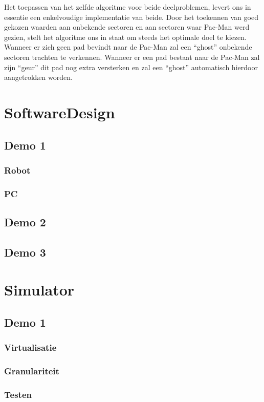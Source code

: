 \documentclass[12pt,a4paper]{report}
\begin{document}
Het toepassen van het zelfde algoritme voor beide deelproblemen, levert ons in essentie een enkelvoudige implementatie van beide. Door het toekennen van goed gekozen waarden aan onbekende sectoren en aan sectoren waar Pac-Man werd gezien, stelt het algoritme ons in staat om steeds het optimale doel te kiezen. Wanneer er zich geen pad bevindt naar de Pac-Man zal een ``ghost'' onbekende sectoren trachten te verkennen. Wanneer er een pad bestaat naar de Pac-Man zal zijn ``geur'' dit pad nog extra versterken en zal een ``ghost'' automatisch hierdoor aangetrokken worden.

\chapter{SoftwareDesign}
\section{Demo 1}
\subsection{Robot}
\subsection{PC}
\section{Demo 2}
\section{Demo 3}


\chapter{Simulator}
\section{Demo 1}
\subsection{Virtualisatie}
\subsection{Granulariteit}
\subsection{Testen}
\end{document}
